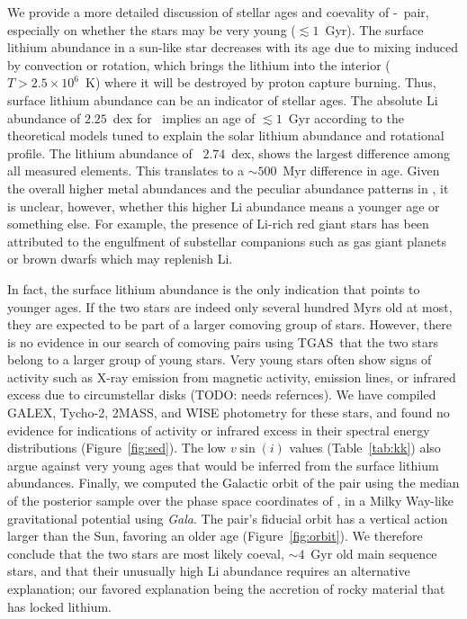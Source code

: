 \documentclass[12pt,letterpaper,margin=1in]{article}
\newcommand{\project}[1]{\textsl{#1}}
\newcommand{\acronym}[1]{{\small{#1}}}
\newcommand{\figname}{Figure}
\newcommand{\tgas}{\acronym{TGAS}}
\newcommand*\elem[1]{\ensuremath{\mathrm{#1}}}
\newcommand{\sunanalog}{\text{Krios}}
\newcommand{\bizarreone}{\text{Kronos}}
\newcommand{\todo}[1]{{\color{red}TODO: #1}}
\renewcommand\tablename{Table}
\begin{document}
We provide a more detailed discussion of stellar ages and coevality of
\bizarreone-\sunanalog\ pair, especially on whether the stars may be
very young ($\lesssim 1$~Gyr).
The surface lithium abundance in a sun-like star decreases with its age due to
mixing induced by convection or rotation, which brings the lithium into the
interior ($T>2.5 \times 10^{6}$~K) where it will be destroyed by proton capture
burning.
Thus, surface lithium abundance can be an indicator of stellar ages.
The absolute $\elem{Li}$ abundance of $2.25$~dex for \sunanalog\ implies an age
of $\lesssim 1$~Gyr according to the theoretical models tuned to explain the
solar lithium abundance and rotational profile\cite{2005Sci...309.2189C}.
The lithium abundance of \bizarreone\, $2.74$~dex, shows the largest difference
among all measured elements.
This translates to a $\sim 500$~Myr difference in age.
Given the overall higher metal abundances and the peculiar abundance patterns
in \bizarreone, it is unclear, however, whether this higher $\elem{Li}$
abundance means a younger age or something else.
For example, the presence of $\elem{Li}$-rich red giant stars has been
attributed to the engulfment of substellar companions such as gas giant planets
or brown dwarfs which may replenish $\elem{Li}$\cite{Casey:2016aa}.

In fact, the surface lithium abundance is the only indication that points to
younger ages.
If the two stars are indeed only several hundred Myrs old at most,
they are expected to be part of a larger comoving group of stars.
However, there is no evidence in our search\cite{2017AJ....153..257O} of
comoving pairs using \tgas\ that the two stars belong to a larger group of
young stars.
Very young stars often show signs of activity such as
X-ray emission from magnetic activity, emission lines, or infrared excess due to
circumstellar disks (\todo{needs refernces}).
We have compiled GALEX, Tycho-2, 2MASS, and WISE photometry for these stars, and
found no evidence for indications of activity or infrared excess in their
spectral energy distributions (\figname~\ref{fig:sed}).
The low $v\sin(i)$ values (\tablename~\ref{tab:kk}) also argue against very
young ages that would be inferred from the surface lithium abundances.
Finally, we computed the Galactic orbit of the pair using the median of the
posterior sample over the phase space coordinates of \sunanalog, in a Milky
Way-like gravitational potential\cite{Bovy:2015} using \project{Gala}\cite{gala}.
The pair's fiducial orbit has a vertical action larger than the Sun, favoring
an older age (\figname~\ref{fig:orbit}).
We therefore conclude that the two stars are most likely coeval, $\sim 4$~Gyr
old main sequence stars, and that their unusually high \elem{Li} abundance
requires an alternative explanation; our favored explanation being the accretion
of rocky material that has locked lithium.
\end{document}
